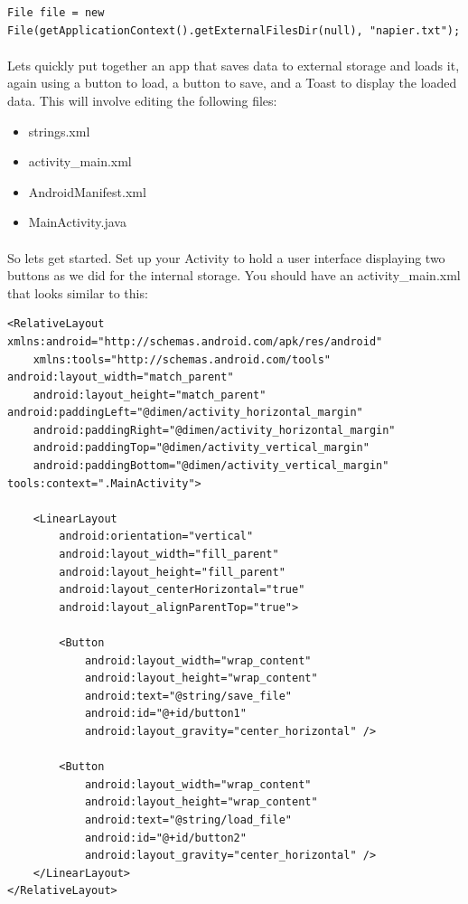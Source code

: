 \documentclass[12pt, a4paper, twoside]{book}
\begin{document}
\begin{lstlisting}
File file = new File(getApplicationContext().getExternalFilesDir(null), "napier.txt");
\end{lstlisting}

\paragraph{} Lets quickly put together an app that saves data to external storage and loads it, again using a button to load, a button to save, and a Toast to display the loaded data. This will involve editing the following files:

\begin{itemize}
\item strings.xml
\item activity\_main.xml
\item AndroidManifest.xml
\item MainActivity.java
\end{itemize}

\paragraph{} So lets get started. Set up your Activity to hold a user interface displaying two buttons as we did for the internal storage. You should have an activity\_main.xml that looks similar to this:

\begin{lstlisting}
<RelativeLayout xmlns:android="http://schemas.android.com/apk/res/android"
    xmlns:tools="http://schemas.android.com/tools" android:layout_width="match_parent"
    android:layout_height="match_parent" android:paddingLeft="@dimen/activity_horizontal_margin"
    android:paddingRight="@dimen/activity_horizontal_margin"
    android:paddingTop="@dimen/activity_vertical_margin"
    android:paddingBottom="@dimen/activity_vertical_margin" tools:context=".MainActivity">

    <LinearLayout
        android:orientation="vertical"
        android:layout_width="fill_parent"
        android:layout_height="fill_parent"
        android:layout_centerHorizontal="true"
        android:layout_alignParentTop="true">

        <Button
            android:layout_width="wrap_content"
            android:layout_height="wrap_content"
            android:text="@string/save_file"
            android:id="@+id/button1"
            android:layout_gravity="center_horizontal" />

        <Button
            android:layout_width="wrap_content"
            android:layout_height="wrap_content"
            android:text="@string/load_file"
            android:id="@+id/button2"
            android:layout_gravity="center_horizontal" />
    </LinearLayout>
</RelativeLayout>

\end{lstlisting}
\end{document}
